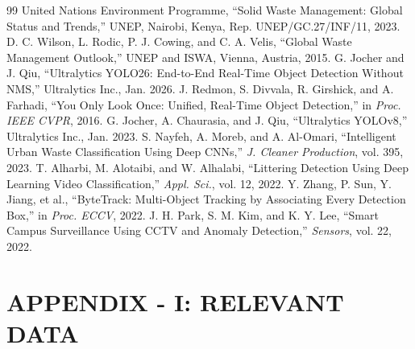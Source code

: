 \documentclass[12pt,a4paper]{report}
\begin{document}
\newpage
\begin{thebibliography}{99}
 United Nations Environment Programme, ``Solid Waste Management: Global Status and Trends,'' UNEP, Nairobi, Kenya, Rep. UNEP/GC.27/INF/11, 2023.
 D. C. Wilson, L. Rodic, P. J. Cowing, and C. A. Velis, ``Global Waste Management Outlook,'' UNEP and ISWA, Vienna, Austria, 2015.
 G. Jocher and J. Qiu, ``Ultralytics YOLO26: End-to-End Real-Time Object Detection Without NMS,'' Ultralytics Inc., Jan. 2026.
 J. Redmon, S. Divvala, R. Girshick, and A. Farhadi, ``You Only Look Once: Unified, Real-Time Object Detection,'' in \textit{Proc. IEEE CVPR}, 2016.
 G. Jocher, A. Chaurasia, and J. Qiu, ``Ultralytics YOLOv8,'' Ultralytics Inc., Jan. 2023.
 S. Nayfeh, A. Moreb, and A. Al-Omari, ``Intelligent Urban Waste Classification Using Deep CNNs,'' \textit{J. Cleaner Production}, vol. 395, 2023.
 T. Alharbi, M. Alotaibi, and W. Alhalabi, ``Littering Detection Using Deep Learning Video Classification,'' \textit{Appl. Sci.}, vol. 12, 2022.
 Y. Zhang, P. Sun, Y. Jiang, et al., ``ByteTrack: Multi-Object Tracking by Associating Every Detection Box,'' in \textit{Proc. ECCV}, 2022.
 J. H. Park, S. M. Kim, and K. Y. Lee, ``Smart Campus Surveillance Using CCTV and Anomaly Detection,'' \textit{Sensors}, vol. 22, 2022.
\end{thebibliography}

\newpage
\chapter*{APPENDIX - I: RELEVANT DATA}
\end{document}
